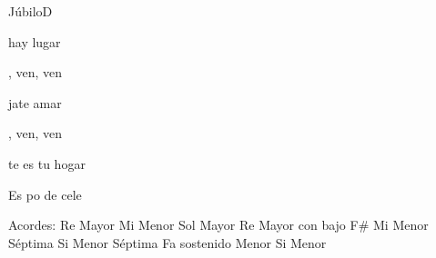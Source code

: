 \documentclass[12pt, spanish]{book}
\begin{document}
\begin{song}{Júbilo}{D}
\begin{SBOpGroup}
             hay lugar

            , ven, ven

            jate amar

            , ven, ven

            te es tu hogar

            Es po de cele
        \end{SBOpGroup}

        \ifChordBk
        \begin{SBOpGroup}
            Acordes:
            \upchord{\D}\qquad Re Mayor \hfill
            \upchord{\Em}\qquad Mi Menor \hfill\null\break
            \upchord{\G}\qquad Sol Mayor \hfill
            \upchord{\DFs}\qquad Re Mayor con bajo F\# \hfill\null\break
            \upchord{\Emseven}\qquad Mi Menor S\'eptima \hfill
            \upchord{\Bmseven}\qquad Si Menor S\'eptima \hfill\null\break
            \upchord{\Fsm}\qquad Fa sostenido Menor \hfill
            \upchord{\Bm}\qquad Si Menor \hfill\null\break
        \end{SBOpGroup}
        \fi
    \end{song}
\end{document}
